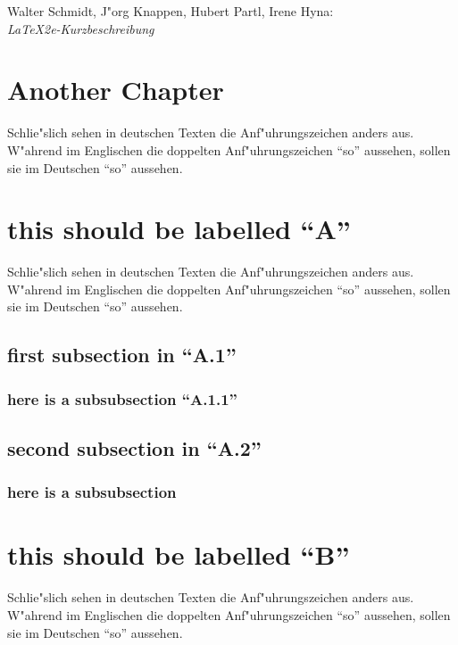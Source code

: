 \documentclass[11pt]{article} %
\begin{document}
\begin{thebibliography}{9} 
 
Walter Schmidt, J"org Knappen, Hubert Partl, Irene Hyna:\\
\textit{LaTeX2e-Kurzbeschreibung}

\section{Another Chapter}

Schlie"slich sehen in deutschen Texten die Anf"uhrungszeichen anders
aus. W"ahrend im Englischen die doppelten Anf"uhrungszeichen ``so''
aussehen, sollen sie im Deutschen "`so"' aussehen. 

\appendix

\section{this should be labelled ``A''}

Schlie"slich sehen in deutschen Texten die Anf"uhrungszeichen anders
aus. W"ahrend im Englischen die doppelten Anf"uhrungszeichen ``so''
aussehen, sollen sie im Deutschen "`so"' aussehen. 

\subsection{first subsection in ``A.1''}

\subsubsection{here is a subsubsection ``A.1.1''}

\subsection{second subsection in ``A.2''}

\subsubsection{here is a subsubsection}

\section{this should be labelled ``B''}

Schlie"slich sehen in deutschen Texten die Anf"uhrungszeichen anders
aus. W"ahrend im Englischen die doppelten Anf"uhrungszeichen ``so''
aussehen, sollen sie im Deutschen "`so"' aussehen. 

\end{thebibliography}
 
\end{document}

